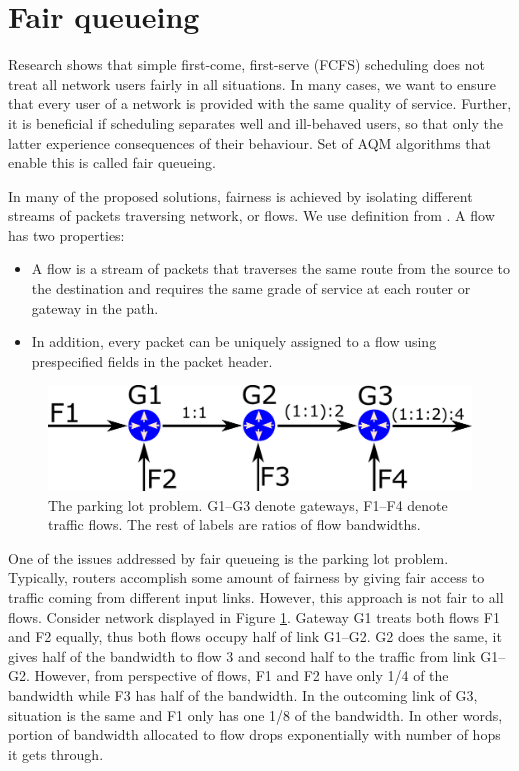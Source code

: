 \section{Fair queueing}
\label{sec:fair_queueing}
Research shows \cite{Nagle:FQ} that simple first-come, first-serve (FCFS) scheduling does not treat all network users fairly in all situations. In many cases, we want to ensure that every user of a network is provided with the same quality of service. Further, it is beneficial if scheduling separates well and ill-behaved users, so that only the latter experience consequences of their behaviour. Set of AQM algorithms that enable this is called fair queueing.


In many of the proposed solutions, fairness is achieved by isolating different streams of packets traversing network, or flows. We use definition from \cite{Zhang:1990:VCN:99517.99525}. A flow has two properties:
\begin{itemize}
	\item A flow is a stream of packets that traverses the same route from the source to the destination and requires the same grade of service at each router or gateway in the path.
	\item In addition, every packet can be uniquely assigned to a flow using prespecified fields in the packet header.
\end{itemize}
 
\begin{figure}
	\centering
	\includegraphics[width=137mm]{drawings/parking_lot}
	\caption{The parking lot problem. G1--G3 denote gateways, F1--F4 denote traffic flows. The rest of labels are ratios of flow bandwidths.}
	
	\label{fig05:ParkingLot}
\end{figure}

One of the issues addressed by fair queueing is the parking lot problem. Typically, routers accomplish some amount of fairness by giving fair access to traffic coming from different input links. However, this approach is not fair to all flows. Consider network displayed in Figure \ref{fig05:ParkingLot}. Gateway G1 treats both flows F1 and F2 equally, thus both flows occupy half of link G1--G2. G2 does the same, it gives half of the bandwidth to flow 3 and second half to the traffic from link G1--G2. However, from perspective of flows, F1 and F2 have only 1/4 of the bandwidth while F3 has half of the bandwidth. In the outcoming link of G3, situation is the same and F1 only has one 1/8 of the bandwidth. In other words, portion of bandwidth allocated to flow drops exponentially with number of hops it gets through.

